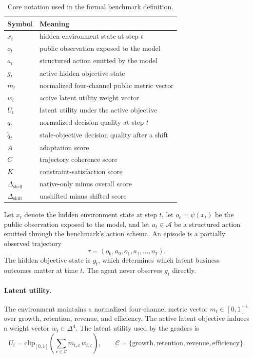 \begin{table}[tbp]
  \centering
  \scriptsize
  \setlength{\tabcolsep}{5pt}
  \begin{tabular}{ll}
    \toprule
    Symbol & Meaning \\
    \midrule
    $x_t$ & hidden environment state at step $t$ \\
    $o_t$ & public observation exposed to the model \\
    $a_t$ & structured action emitted by the model \\
    $g_t$ & active hidden objective state \\
    $m_t$ & normalized four-channel public metric vector \\
    $w_t$ & active latent utility weight vector \\
    $U_t$ & latent utility under the active objective \\
    $q_t$ & normalized decision quality at step $t$ \\
    $\tilde{q}_t$ & stale-objective decision quality after a shift \\
    $A$ & adaptation score \\
    $C$ & trajectory coherence score \\
    $K$ & constraint-satisfaction score \\
    $\Delta_{\mathrm{shell}}$ & native-only minus overall score \\
    $\Delta_{\mathrm{shift}}$ & unshifted minus shifted score \\
    \bottomrule
  \end{tabular}
  \caption{Core notation used in the formal benchmark definition.}
  \label{tab:notation}
\end{table}

Let $x_t$ denote the hidden environment state at step $t$, let
$o_t = \psi(x_t)$ be the public observation exposed to the model, and let
$a_t \in \mathcal{A}$ be a structured action emitted through the benchmark's
action schema. An episode is a partially observed trajectory
\[
\tau = (o_0, a_0, o_1, a_1, \ldots, o_T).
\]
The hidden objective state is $g_t$, which determines which latent business
outcomes matter at time $t$. The agent never observes $g_t$ directly.

\paragraph{Latent utility.}
The environment maintains a normalized four-channel metric vector
$m_t \in [0,1]^4$ over growth, retention, revenue, and efficiency. The active
latent objective induces a weight vector $w_t \in \Delta^4$. The latent utility
used by the graders is
\[
U_t = \mathrm{clip}_{[0,1]} \left( \sum_{c \in \mathcal{C}} m_{t,c} \, w_{t,c} \right),
\qquad
\mathcal{C} = \{\text{growth}, \text{retention}, \text{revenue}, \text{efficiency}\}.
\]

